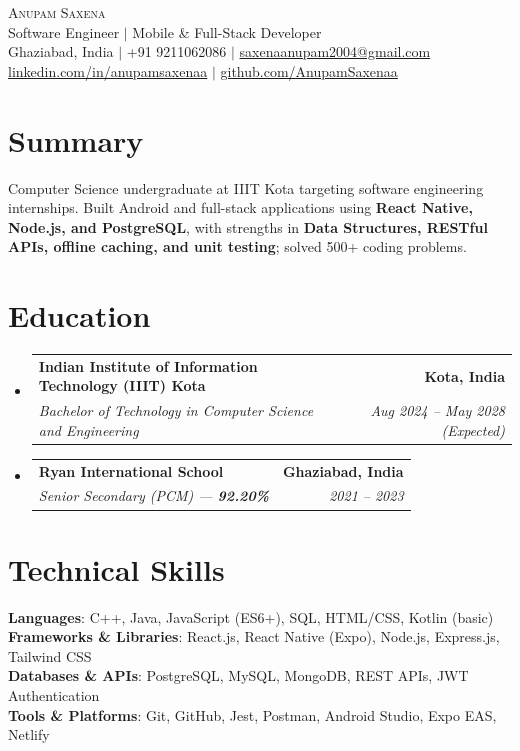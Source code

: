\documentclass[letterpaper,10pt]{article}
\makeatletter
\newcommand{\resumeSubheading}[4]{
  \vspace{-1pt}\item
    \begin{tabular*}{1.0\textwidth}[t]{l@{\extracolsep{\fill}}r}
      \textbf{#1} & \textbf{\small #2} \\
      \textit{\small#3} & \textit{\small #4} \\
    \end{tabular*}\vspace{-5pt}
}
\newcommand{\resumeSubHeadingListStart}{\begin{itemize}[leftmargin=0.0in, label={}, topsep=2pt, itemsep=5pt]}
\newcommand{\resumeSubHeadingListEnd}{\end{itemize}}
\makeatother
\begin{document}
\begin{center}
  {\Huge \scshape Anupam Saxena} \\ \vspace{2pt}
  {\large Software Engineer $|$ Mobile \& Full-Stack Developer} \\ \vspace{3pt}
  \small
  Ghaziabad, India $|$ +91 9211062086 $|$
  \href{mailto:saxenaanupam2004@gmail.com}{saxenaanupam2004@gmail.com} \\ \vspace{2pt}
  \href{https://www.linkedin.com/in/anupamsaxenaa/}{linkedin.com/in/anupamsaxenaa} $|$
  \href{https://github.com/AnupamSaxenaa}{github.com/AnupamSaxenaa}
  \vspace{-6pt}
\end{center}

\section{Summary}
{
Computer Science undergraduate at IIIT Kota targeting software engineering internships. Built Android
and full-stack applications using \textbf{React Native, Node.js, and PostgreSQL}, with strengths in
\textbf{Data Structures, RESTful APIs, offline caching, and unit testing}; solved 500+ coding problems.
}
\vspace{-6pt}

\section{Education}
  \resumeSubHeadingListStart
    \resumeSubheading
      {Indian Institute of Information Technology (IIIT) Kota}{Kota, India}
      {Bachelor of Technology in Computer Science and Engineering}{Aug 2024 -- May 2028 (Expected)}
    \resumeSubheading
      {Ryan International School}{Ghaziabad, India}
      {Senior Secondary (PCM) --- \textbf{92.20\%}}{2021 -- 2023}
  \resumeSubHeadingListEnd
\vspace{-4pt}

\section{Technical Skills}
 \begin{itemize}[leftmargin=0.15in, label={}]
    \small{\item{
     \textbf{Languages}{: C++, Java, JavaScript (ES6+), SQL, HTML/CSS, Kotlin (basic)} \\
     \textbf{Frameworks \& Libraries}{: React.js, React Native (Expo), Node.js, Express.js, Tailwind CSS} \\
     \textbf{Databases \& APIs}{: PostgreSQL, MySQL, MongoDB, REST APIs, JWT Authentication} \\
     \textbf{Tools \& Platforms}{: Git, GitHub, Jest, Postman, Android Studio, Expo EAS, Netlify}
    }}
 \end{itemize}
 \vspace{-8pt}
\end{document}
